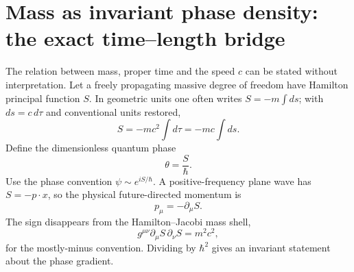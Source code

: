 \documentclass[11pt]{article}
\theoremstyle{definition}\newtheorem{definition}[theorem]{Definition}
\theoremstyle{remark}\newtheorem{remark}[theorem]{Remark}\newtheorem{conjecture}[theorem]{Conjecture}
\begin{document}
\section{Mass as invariant phase density: the exact time--length bridge}
The relation between mass, proper time and the speed $c$ can be stated without interpretation. Let a freely propagating massive degree of freedom have Hamilton principal function $S$. In geometric units one often writes $S=-m\int ds$; with $ds=c\,d\tau$ and conventional units restored,
\begin{equation}\label{eq:massaction}
 S=-mc^2\int d\tau=-mc\int ds.
\end{equation}
Define the dimensionless quantum phase
\begin{equation}\label{eq:theta}
 \theta=\frac{S}{\hbar}.
\end{equation}
Use the phase convention $\psi\sim e^{iS/\hbar}$. A positive-frequency plane wave has $S=-p\cdot x$, so the physical future-directed momentum is
\begin{equation}\label{eq:HJmomentumsign}
 p_\mu=-\partial_\mu S.
\end{equation}
The sign disappears from the Hamilton--Jacobi mass shell,
\begin{equation}\label{eq:HJmass}
 g^{\mu\nu}\partial_\mu S\,\partial_\nu S=m^2c^2,
\end{equation}
for the mostly-minus convention. Dividing by $\hbar^2$ gives an invariant statement about the phase gradient.
\end{document}
